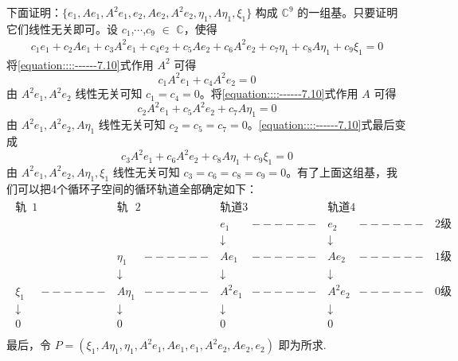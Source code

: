 \documentclass[../../main.tex]{subfiles}%
\begin{document}
\begin{solution}
下面证明：$\{e_1,Ae_1,A^2e_1,e_2,Ae_2,A^2e_2,\eta_1,A\eta_1,\xi_1\}$ 构成 $\mathbb{C}^9$ 的一组基。只要证明它们线性无关即可。设 $c_1$,$\cdots$,$c_9$ $\in$ $\mathbb{C}$，使得
\begin{align}
c_1e_1 + c_2Ae_1 + c_3A^2e_1 + c_4e_2 + c_5Ae_2 + c_6A^2e_2 + c_7\eta_1 + c_8A\eta_1 + c_9\xi_1 = 0\label{equation::::------7.10}
\end{align}
将\eqref{equation::::------7.10}式作用 $A^2$ 可得
\[c_1A^2e_1 + c_4A^2e_2 = 0\]
由 $A^2e_1,A^2e_2$ 线性无关可知 $c_1 = c_4 = 0$。将\eqref{equation::::------7.10}式作用 $A$ 可得
\[c_2A^2e_1 + c_5A^2e_2 + c_7A\eta_1 = 0\]
由 $A^2e_1,A^2e_2,A\eta_1$ 线性无关可知 $c_2 = c_5 = c_7 = 0$。\eqref{equation::::------7.10}式最后变成
\[c_3A^2e_1 + c_6A^2e_2 + c_8A\eta_1 + c_9\xi_1 = 0\]
由 $A^2e_1,A^2e_2,A\eta_1,\xi_1$ 线性无关可知 $c_3 = c_6 = c_8 = c_9 = 0$。有了上面这组基，我们可以把4个循环子空间的循环轨道全部确定如下：
\begin{align*}
\begin{matrix}
\text{轨道}1&		&		\text{轨道}2&		&		\text{轨道}3&		&		\text{轨道}4&		&		\\
&		&		&		&		e_1&		------&		e_2&		------&		2\text{级广义特征向量}\\
&		&		&		&		\downarrow&		&		\downarrow&		&		\\
&		&		\eta _1&		------&		Ae_1&		------&		Ae_2&		------&		1\text{级广义特征向量}\\
&		&		\downarrow&		&		\downarrow&		&		\downarrow&		&		\\
\xi _1&		------&		A\eta _1&		------&		A^2e_1&		------&		A^2e_2&		------&		0\text{级广义特征向量}\\
\downarrow&		&		\downarrow&		&		\downarrow&		&		\downarrow&		&		\\
0&		&		0&		&		0&		&		0&		&		\\
\end{matrix}
\end{align*}
最后，令 $P = (\xi_1,A\eta_1,\eta_1,A^2e_1,Ae_1,e_1,A^2e_2,Ae_2,e_2)$ 即为所求.

\end{solution}
\end{document}
